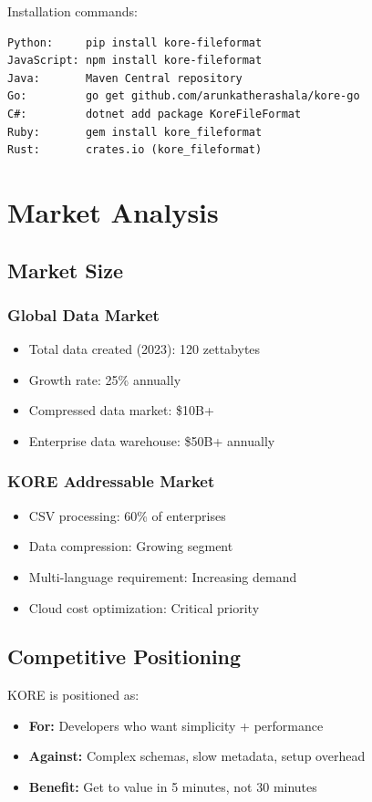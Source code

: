 \documentclass[12pt,a4paper]{report}
\begin{document}
Installation commands:
\begin{verbatim}
Python:     pip install kore-fileformat
JavaScript: npm install kore-fileformat
Java:       Maven Central repository
Go:         go get github.com/arunkatherashala/kore-go
C#:         dotnet add package KoreFileFormat
Ruby:       gem install kore_fileformat
Rust:       crates.io (kore_fileformat)
\end{verbatim}

\chapter{Market Analysis}

\section{Market Size}

\subsection{Global Data Market}
\begin{itemize}
    \item Total data created (2023): 120 zettabytes
    \item Growth rate: 25\% annually
    \item Compressed data market: \$10B+
    \item Enterprise data warehouse: \$50B+ annually
\end{itemize}

\subsection{KORE Addressable Market}
\begin{itemize}
    \item CSV processing: 60\% of enterprises
    \item Data compression: Growing segment
    \item Multi-language requirement: Increasing demand
    \item Cloud cost optimization: Critical priority
\end{itemize}

\section{Competitive Positioning}

KORE is positioned as:
\begin{itemize}
    \item \textbf{For:} Developers who want simplicity + performance
    \item \textbf{Against:} Complex schemas, slow metadata, setup overhead
    \item \textbf{Benefit:} Get to value in 5 minutes, not 30 minutes
\end{itemize}
\end{document}
